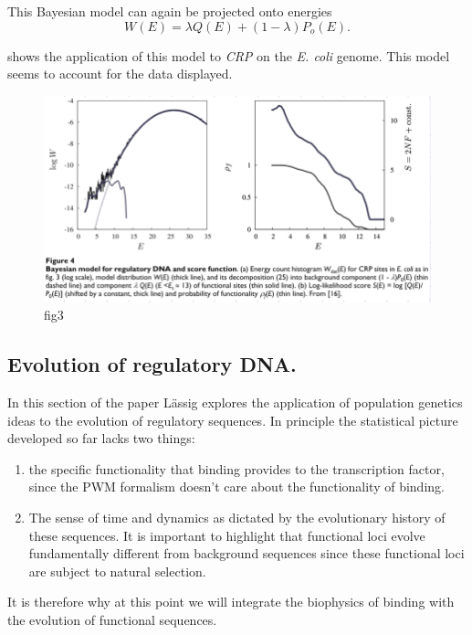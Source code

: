 This Bayesian model can again be projected onto energies
\begin{equation}
  W(E) = \lambda Q(E) + (1 - \lambda) P_o(E).
\end{equation}

 shows the application of this model to {\it CRP} on the
{\it E. coli} genome. This model seems to account for the data displayed.

\begin{figure}[h!]
	\centering \includegraphics[scale=0.5]{../fig/lassig_2007/fig4.png}
	\caption{fig3}
  \label{fig_bayesian_dna}
\end{figure}

\subsection{Evolution of regulatory DNA.}

In this section of the paper L\"{a}ssig explores the application of population
genetics ideas to the evolution of regulatory sequences. In principle the
statistical picture developed so far lacks two things:
\begin{enumerate}
  \item the specific functionality that binding provides to the transcription
  factor, since the PWM formalism doesn't care about the functionality of
  binding.
  \item The sense of time and dynamics as dictated by the evolutionary history
  of these sequences. It is important to highlight that functional loci evolve
  fundamentally different from background sequences since these functional loci
  are subject to natural selection.
\end{enumerate}
It is therefore why at this point we will integrate the biophysics of binding
with the evolution of functional sequences.

